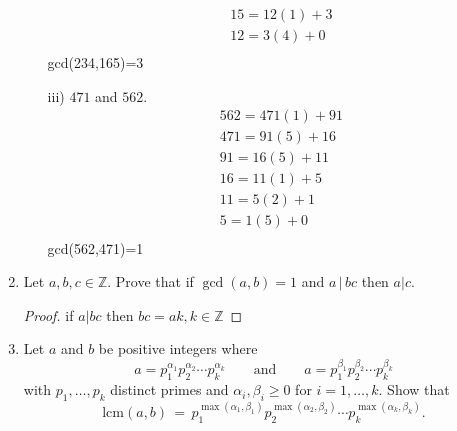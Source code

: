 \documentclass[11pt]{article}
\theoremstyle{definition}  %
\newcommand{\Z}{\mathbb{Z}}
\newcommand{\lcm}{\mathrm{lcm}}
\begin{document}
\begin{enumerate}
\begin{itemize}
\begin{align*}
  &15=12(1)+3\\
  &12=3(4)+0\\
\end{align*}
  gcd(234,165)=3
  \item[iii)] $471$ and $562$.
  \begin{align*}
  &562=471(1)+91\\
  &471=91(5)+16\\
  &91=16(5)+11\\
  &16=11(1)+5\\
  &11=5(2)+1\\
  &5=1(5)+0\\
\end{align*}
gcd(562,471)=1
  \end{itemize}
\item Let $a, b, c \in \Z$. Prove that if $\gcd(a,b) =1$ and $a \, | \, bc$ then $a | c$.
\begin{proof}
if $a|bc$ then $bc=ak,k \in \Z$
\end{proof}

\item Let $a$ and $b$ be positive integers where
  $$ a = p_1^{\alpha_1} p_2^{\alpha_2} \cdots p_k^{\alpha_k}  \quad \quad \mbox{and}  \quad \quad a = p_1^{\beta_1} p_2^{\beta_2} \cdots p_k^{\beta_k}  $$
  with $p_1, \ldots, p_k$ distinct primes and $\alpha_i, \beta_i \geq 0$ for $i=1, \ldots, k$. Show that
  $$ \lcm(a,b) \, = \, p_1^{\max(\alpha_1, \beta_1)} p_2^{\max(\alpha_2, \beta_2)} \cdots p_k^{\max(\alpha_k,\beta_k)}. $$



\end{enumerate}
\end{document}
